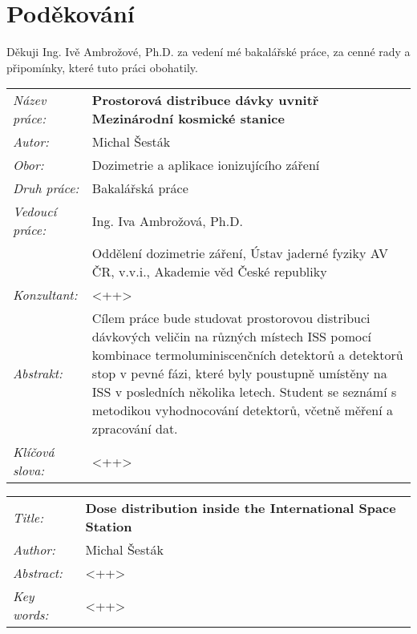 \section*{Poděkování}
Děkuji Ing. Ivě Ambrožové, Ph.D. za vedení mé bakalářské práce, za cenné rady a připomínky, které tuto práci obohatily.
\newpage
\begin{tabularx}{\textwidth}{>{\itshape}l X}
  Název práce: & \textbf{Prostorová distribuce dávky uvnitř Mezinárodní kosmické stanice}\\
  Autor: & Michal Šesták\\
  Obor: & Dozimetrie a aplikace ionizujícího záření\\
  Druh práce: & Bakalářská práce\\
  Vedoucí práce: & Ing. Iva Ambrožová, Ph.D.\\ 
               & Oddělení dozimetrie záření, Ústav jaderné fyziky AV ČR, v.v.i., Akademie věd České republiky\\
  Konzultant: & <++>\\
  Abstrakt: &  	
Cílem práce bude studovat prostorovou distribuci dávkových veličin na různých místech ISS pomocí kombinace termoluminiscenčních detektorů a detektorů stop v pevné fázi, které byly poustupně umístěny na ISS v posledních několika letech. Student se seznámí s metodikou vyhodnocování detektorů, včetně měření a zpracování dat. \\
  Klíčová slova: & <++>
\end{tabularx}
\newpage
\begin{tabularx}{\textwidth}{>{\itshape}l X}
  Title: & \textbf{Dose distribution inside the International Space Station}\\
  Author: & Michal Šesták\\
  Abstract: & <++>\\
  Key words: & <++>
\end{tabularx}
\newpage
